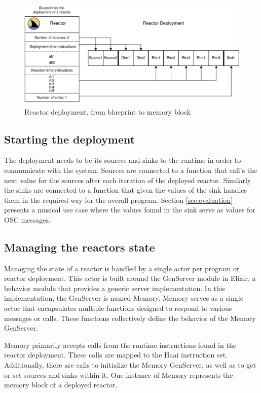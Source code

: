 \documentclass[a4paper]{book}
\begin{document}
\begin{figure}[h]
	\includegraphics[width=\textwidth]{rd.drawio}
	\caption{Reactor deployment, from blueprint to memory block}
	\label{fig:rde}
\end{figure} 

\subsection{Starting the deployment}
The deployment needs to be its sources and sinks to the runtime in order to communicate with the system. Sources are connected to a function that call's the next value for the sources after each iteration of the deployed reactor. Similarly the sinks are connected to a function that given the values of the sink handles them in the required way for the overall program. Section \ref{sec:evaluation} presents a musical use case where the values found in the sink serve as values for OSC messages.


\subsection{Managing the reactors state}
Managing the state of a reactor is handled by a single actor per program or reactor deployment. This actor is built around the GenServer module in Elixir, a behavior module that provides a generic server implementation. In this implementation, the GenServer is named Memory. Memory serves as a single actor that encapsulates multiple functions designed to respond to various messages or calls. These functions collectively define the behavior of the Memory GenServer.

Memory primarily accepts calls from the runtime instructions found in the reactor deployment. These calls are mapped to the Haai instruction set. Additionally, there are calls to initialize the Memory GenServer, as well as to get or set sources and sinks within it. One instance of Memory represents the memory block of a deployed reactor.
\end{document}
